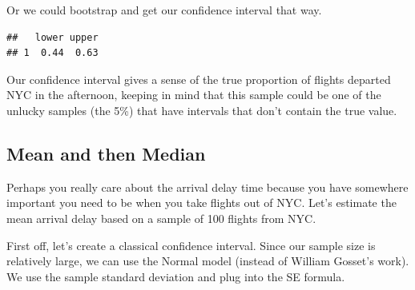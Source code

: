 \documentclass[]{book}
\newenvironment{Shaded}{\begin{snugshade}}{\end{snugshade}}
\newcommand{\CommentTok}[1]{\textcolor[rgb]{0.56,0.35,0.01}{\textit{#1}}}
\newcommand{\DataTypeTok}[1]{\textcolor[rgb]{0.13,0.29,0.53}{#1}}
\newcommand{\DecValTok}[1]{\textcolor[rgb]{0.00,0.00,0.81}{#1}}
\newcommand{\FloatTok}[1]{\textcolor[rgb]{0.00,0.00,0.81}{#1}}
\newcommand{\KeywordTok}[1]{\textcolor[rgb]{0.13,0.29,0.53}{\textbf{#1}}}
\newcommand{\NormalTok}[1]{#1}
\newcommand{\OperatorTok}[1]{\textcolor[rgb]{0.81,0.36,0.00}{\textbf{#1}}}
\newcommand{\OtherTok}[1]{\textcolor[rgb]{0.56,0.35,0.01}{#1}}
\newcommand{\StringTok}[1]{\textcolor[rgb]{0.31,0.60,0.02}{#1}}
\begin{document}
Or we could bootstrap and get our confidence interval that way.

\begin{Shaded}
\end{Shaded}

\begin{verbatim}
##   lower upper
## 1  0.44  0.63
\end{verbatim}

Our confidence interval gives a sense of the true proportion of flights departed NYC in the afternoon, keeping in mind that this sample could be one of the unlucky samples (the 5\%) that have intervals that don't contain the true value.

\hypertarget{mean-and-then-median}{%
\subsection{Mean and then Median}\label{mean-and-then-median}}

Perhaps you really care about the arrival delay time because you have somewhere important you need to be when you take flights out of NYC. Let's estimate the mean arrival delay based on a sample of 100 flights from NYC.

First off, let's create a classical confidence interval. Since our sample size is relatively large, we can use the Normal model (instead of William Gosset's work). We use the sample standard deviation and plug into the SE formula.
\end{document}
